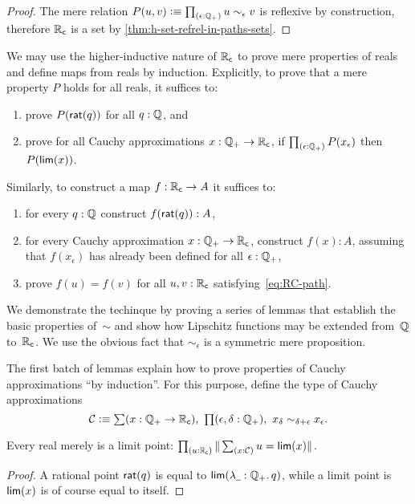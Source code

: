 \begin{proof}
  The mere relation $P(u,v) \defeq \prd{\epsilon : \Qp} u \sim_\epsilon v$ is reflexive by
  construction, therefore $\mathbb{R}_\mathsf{c}$ is a set by \autoref{thm:h-set-refrel-in-paths-sets}.
\end{proof}

We may use the higher-inductive nature of $\mathbb{R}_\mathsf{c}$ to prove mere properties of reals and
define maps from reals by induction. Explicitly, to prove that a mere property $P$ holds
for all reals, it suffices to:
%
\begin{enumerate}
\item prove $P(\mathsf{rat}(q))$ for all $q : \mathbb{Q}$, and
\item prove for all Cauchy approximations $x : \mathbb{Q}_{+} \to \mathbb{R}_\mathsf{c}$, if $\prd{\epsilon : \Qp}
  P(x_\epsilon)$ then $P(\mathsf{lim}(x))$.
\end{enumerate}
%
Similarly, to construct a map $f : \mathbb{R}_\mathsf{c} \to A$ it suffices to:
%
\begin{enumerate}
\item for every $q : \mathbb{Q}$ construct $f(\mathsf{rat}(q)) : A$,
\item for every Cauchy approximation $x : \mathbb{Q}_{+} \to \mathbb{R}_\mathsf{c}$, construct $f(x) : A$,
  assuming that $f(x_\epsilon)$ has already been defined for all $\epsilon : \mathbb{Q}_{+}$,
\item prove $f(u) = f(v)$ for all $u, v : \mathbb{R}_\mathsf{c}$ satisfying~\eqref{eq:RC-path}.
\end{enumerate}
%
We demonstrate the techinque by proving a series of lemmas that establish the basic
properties of~$\sim$ and show how Lipschitz functions may be extended from~$\mathbb{Q}$ to~$\mathbb{R}_\mathsf{c}$. 
We use the obvious fact that $\sim_\epsilon$ is a symmetric mere proposition.

The first batch of lemmas explain how to prove properties of Cauchy approximations ``by
induction''. For this purpose, define the type of Cauchy approximations
% 
\begin{equation*}
  \CAP \defeq
  \sm{x : \Qp \to \RC} \prd{\epsilon, \delta : \Qp} x_\delta \sim_{\delta + \epsilon} x_\epsilon.
\end{equation*}

\begin{lem} \label{RC-lim-onto}
  Every real merely is a limit point: $\prd{u : \RC} \brck{\sm{x : \CAP} u = \rclim(x)}$.
\end{lem}

\begin{proof}
  A rational point $\mathsf{rat}(q)$ is equal to $\rclim(\lam{\blank : \Qp} q)$, while a limit
  point is $\mathsf{lim}(x)$ is of course equal to itself.
\end{proof}

